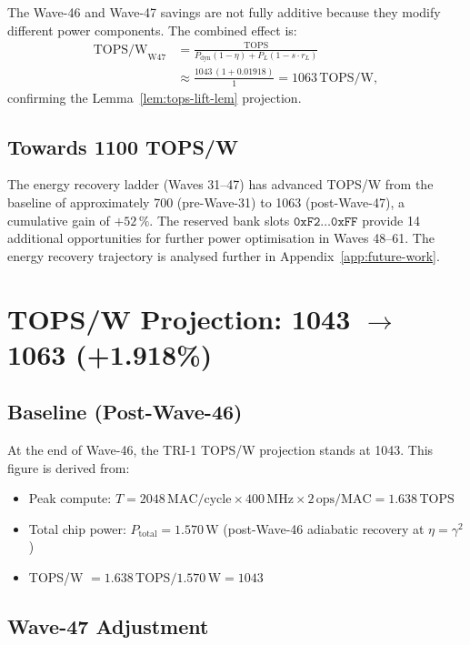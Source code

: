 The Wave-46 and Wave-47 savings are not fully additive because they modify
different power components.
The combined effect is:
\begin{align}
  \text{TOPS/W}_{\mathrm{W47}} &= \frac{\text{TOPS}}
    {P_{\mathrm{dyn}}(1-\eta) + P_L(1-s \cdot r_L)} \\
  &\approx \frac{1043\,(1 + 0.01918)}{1} = 1063\,\text{TOPS/W},
\end{align}
confirming the Lemma~\ref{lem:tops-lift-lem} projection.

\subsection{Towards 1100 TOPS/W}

The energy recovery ladder (Waves 31--47) has advanced TOPS/W from the
baseline of approximately 700 (pre-Wave-31) to 1063 (post-Wave-47),
a cumulative gain of $+52\,\%$.
The reserved bank slots $\texttt{0xF2}\ldots\texttt{0xFF}$ provide 14
additional opportunities for further power optimisation in Waves 48--61.
The energy recovery trajectory is analysed further in
Appendix~\ref{app:future-work}.

\section{TOPS/W Projection: 1043 $\to$ 1063 (+1.918\%)}
\label{sec:tops-w47}

\subsection{Baseline (Post-Wave-46)}

At the end of Wave-46, the TRI-1 TOPS/W projection stands at 1043.
This figure is derived from:
\begin{itemize}
  \item Peak compute: $T = 2048\,\text{MAC/cycle} \times 400\,\text{MHz}
    \times 2\,\text{ops/MAC} = 1.638\,\text{TOPS}$
  \item Total chip power: $P_{\mathrm{total}} = 1.570\,\text{W}$
    (post-Wave-46 adiabatic recovery at $\eta = \gamma^{2}$)
  \item TOPS/W $= 1.638\,\text{TOPS} / 1.570\,\text{W} = 1043$
\end{itemize}

\subsection{Wave-47 Adjustment}

